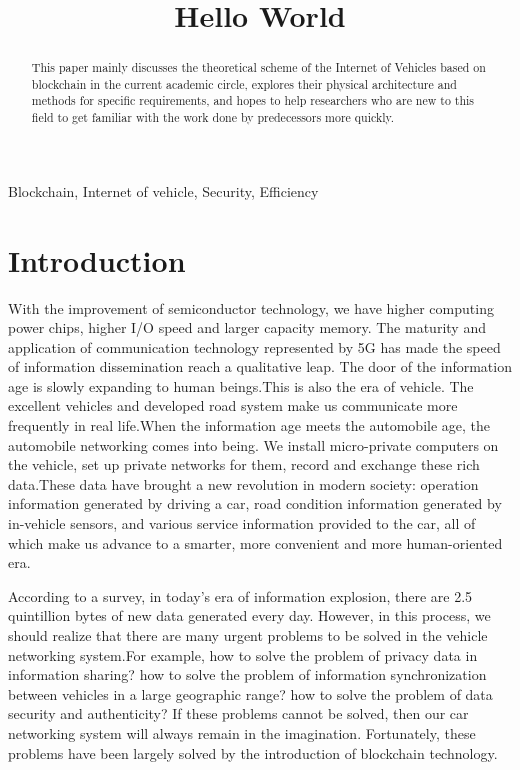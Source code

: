 
\title{Hello World} 
\begin{abstract}
This paper mainly discusses the theoretical scheme of the Internet of Vehicles based on blockchain in the current academic circle, explores their physical architecture and methods for specific requirements, and hopes to help researchers who are new to this field to get familiar with the work done by predecessors more quickly.
\end{abstract}

\begin{IEEEkeywords}Blockchain, Internet of vehicle, Security, Efficiency\end{IEEEkeywords}

\section{Introduction}
With the improvement of semiconductor technology, we have higher computing power chips, higher I/O speed and larger capacity memory. The maturity and application of communication technology represented by 5G has made the speed of information dissemination reach a qualitative leap. The door of the information age is slowly expanding to human beings.This is also the era of vehicle. The excellent vehicles and developed road system make us communicate more frequently in real life.When the information age meets the automobile age, the automobile networking comes into being. We install micro-private computers on the vehicle, set up private networks for them, record and exchange these rich data.These data have brought a new revolution in modern society: operation information generated by driving a car, road condition information generated by in-vehicle sensors, and various service information provided to the car, all of which make us advance to a smarter, more convenient and more human-oriented era.

According to a survey, in today's era of information explosion, there are 2.5 quintillion bytes of new data generated every day. However, in this process, we should realize that there are many urgent problems to be solved in the vehicle networking system.For example, how to solve the problem of privacy data in information sharing? how to solve the problem of information synchronization between vehicles in a large geographic range? how to solve the problem of data security and authenticity? If these problems cannot be solved, then our car networking system will always remain in the imagination. Fortunately, these problems have been largely solved by the introduction of blockchain technology.

